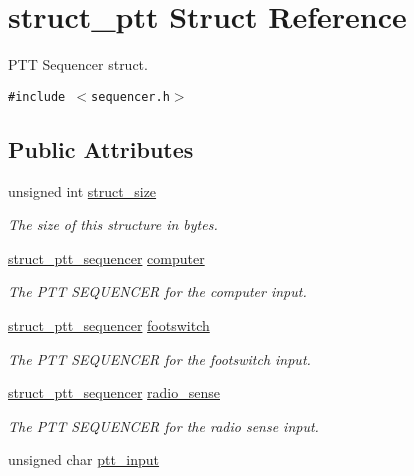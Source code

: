 \hypertarget{structstruct__ptt}{
\section{struct\_\-ptt Struct Reference}
\label{structstruct__ptt}
}
PTT Sequencer struct.  


{\tt \#include $<$sequencer.h$>$}

\subsection*{Public Attributes}
\begin{CompactItemize}
\item 
\hypertarget{structstruct__ptt_4ea3cdc7f0e0f774a90b48f6ed9f61d3}{
unsigned int \hyperlink{structstruct__ptt_4ea3cdc7f0e0f774a90b48f6ed9f61d3}{struct\_\-size}}
\label{structstruct__ptt_4ea3cdc7f0e0f774a90b48f6ed9f61d3}

\begin{CompactList}\small\item\em The size of this structure in bytes. \item\end{CompactList}\item 
\hypertarget{structstruct__ptt_bb93f1272d80233f433b49b052316774}{
\hyperlink{structstruct__ptt__sequencer}{struct\_\-ptt\_\-sequencer} \hyperlink{structstruct__ptt_bb93f1272d80233f433b49b052316774}{computer}}
\label{structstruct__ptt_bb93f1272d80233f433b49b052316774}

\begin{CompactList}\small\item\em The PTT SEQUENCER for the computer input. \item\end{CompactList}\item 
\hypertarget{structstruct__ptt_51bb98b0b9df549361707d08d93a37e6}{
\hyperlink{structstruct__ptt__sequencer}{struct\_\-ptt\_\-sequencer} \hyperlink{structstruct__ptt_51bb98b0b9df549361707d08d93a37e6}{footswitch}}
\label{structstruct__ptt_51bb98b0b9df549361707d08d93a37e6}

\begin{CompactList}\small\item\em The PTT SEQUENCER for the footswitch input. \item\end{CompactList}\item 
\hypertarget{structstruct__ptt_3fa51dec2ab56498f53a7fcbf0f9813b}{
\hyperlink{structstruct__ptt__sequencer}{struct\_\-ptt\_\-sequencer} \hyperlink{structstruct__ptt_3fa51dec2ab56498f53a7fcbf0f9813b}{radio\_\-sense}}
\label{structstruct__ptt_3fa51dec2ab56498f53a7fcbf0f9813b}

\begin{CompactList}\small\item\em The PTT SEQUENCER for the radio sense input. \item\end{CompactList}\item 
unsigned char \hyperlink{structstruct__ptt_43c60729257a2cb42fc44af21e394224}{ptt\_\-input}
\end{CompactItemize}


